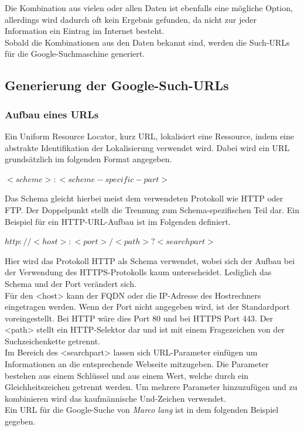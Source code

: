 		
		Die Kombination aus vielen oder allen Daten ist ebenfalls eine mögliche Option, allerdings wird dadurch oft kein Ergebnis gefunden, da nicht zur jeder Information ein Eintrag im Internet besteht.\\
		Sobald die Kombinationen aus den Daten bekannt sind, werden die Such-URLs für die Google-Suchmaschine generiert.
		\subsection{Generierung der Google-Such-URLs}
			\subsubsection{Aufbau eines URLs}
			\label{subsec:AufbauURL}
			Ein Uniform Resource Locator, kurz URL, lokalisiert eine Ressource, indem eine abstrakte Identifikation der Lokalisierung verwendet wird. Dabei wird ein URL grundsätzlich im folgenden Format angegeben.\cite{RFC1738}
			
			$<scheme>:<scheme-specific-part>$ \cite{RFC1738}
			
			Das Schema gleicht hierbei meist dem verwendeten Protokoll wie HTTP oder FTP. Der Doppelpunkt stellt die Trennung zum Schema-spezifischen Teil dar. Ein Beispiel für ein HTTP-URL-Aufbau ist im Folgenden definiert.\cite{RFC1738}
			
			$http://<host>:<port>/<path>?<searchpart>$\cite{RFC1738}
			
			Hier wird das Protokoll HTTP als Schema verwendet, wobei sich der Aufbau bei der Verwendung des HTTPS-Protokolls kaum unterscheidet. Lediglich das Schema und der Port verändert sich.\\
			Für den <host> kann der FQDN oder die IP-Adresse des Hostrechners eingetragen werden. Wenn der Port nicht angegeben wird, ist der Standardport voreingestellt. Bei HTTP wäre dies Port 80 und bei HTTPS Port 443. Der <path> stellt ein HTTP-Selektor dar und ist mit einem Fragezeichen von der Suchzeichenkette getrennt.\cite{RFC1738}\\ %
			Im Bereich des <searchpart> lassen sich URL-Parameter einfügen um Informationen an die entsprechende Webseite mitzugeben. Die Parameter bestehen aus einem Schlüssel und aus einem Wert, welche durch ein Gleichheitszeichen getrennt werden. Um mehrere Parameter hinzuzufügen und zu kombinieren wird das kaufmännische Und-Zeichen verwendet.\cite{GoogleURL}\\
			Ein URL für die Google-Suche von \textit{Marco lang} ist in dem folgenden Beispiel gegeben.
			
